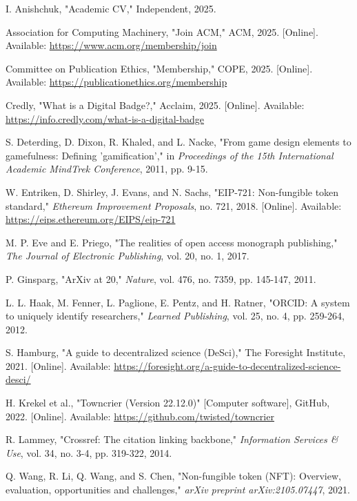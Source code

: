 \documentclass[conference, compsoc, 11pt]{IEEEtran}
\begin{document}
\begin{thebibliography}{99}

I. Anishchuk, "Academic CV," Independent, 2025.

Association for Computing Machinery, "Join ACM," ACM, 2025. [Online]. Available: \url{https://www.acm.org/membership/join}

Committee on Publication Ethics, "Membership," COPE, 2025. [Online]. Available: \url{https://publicationethics.org/membership}

Credly, "What is a Digital Badge?," Acclaim, 2025. [Online]. Available: \url{https://info.credly.com/what-is-a-digital-badge}

S. Deterding, D. Dixon, R. Khaled, and L. Nacke, "From game design elements to gamefulness: Defining 'gamification'," in \textit{Proceedings of the 15th International Academic MindTrek Conference}, 2011, pp. 9-15.

W. Entriken, D. Shirley, J. Evans, and N. Sachs, "EIP-721: Non-fungible token standard," \textit{Ethereum Improvement Proposals}, no. 721, 2018. [Online]. Available: \url{https://eips.ethereum.org/EIPS/eip-721}

M. P. Eve and E. Priego, "The realities of open access monograph publishing," \textit{The Journal of Electronic Publishing}, vol. 20, no. 1, 2017.

P. Ginsparg, "ArXiv at 20," \textit{Nature}, vol. 476, no. 7359, pp. 145-147, 2011.

L. L. Haak, M. Fenner, L. Paglione, E. Pentz, and H. Ratner, "ORCID: A system to uniquely identify researchers," \textit{Learned Publishing}, vol. 25, no. 4, pp. 259-264, 2012.

S. Hamburg, "A guide to decentralized science (DeSci)," The Foresight Institute, 2021. [Online]. Available: \url{https://foresight.org/a-guide-to-decentralized-science-desci/}

H. Krekel et al., "Towncrier (Version 22.12.0)" [Computer software], GitHub, 2022. [Online]. Available: \url{https://github.com/twisted/towncrier}

R. Lammey, "Crossref: The citation linking backbone," \textit{Information Services \& Use}, vol. 34, no. 3-4, pp. 319-322, 2014.

Q. Wang, R. Li, Q. Wang, and S. Chen, "Non-fungible token (NFT): Overview, evaluation, opportunities and challenges," \textit{arXiv preprint arXiv:2105.07447}, 2021.

\end{thebibliography}
\end{document}
